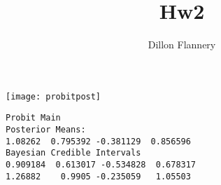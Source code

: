 \documentclass[]{article}
\title{Hw2}
\author{Dillon Flannery	}
\begin{document}
\maketitle


	
\centering
\texttt{[image: probitpost]}
\begin{verbatim}
Probit Main
Posterior Means:
1.08262  0.795392 -0.381129  0.856596
Bayesian Credible Intervals
0.909184  0.613017 -0.534828  0.678317
1.26882    0.9905 -0.235059   1.05503
\end{verbatim}
	
	
	
	
	
	
	
	
	
\end{document}
